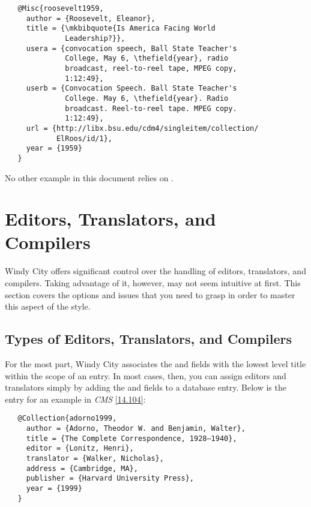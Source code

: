 \documentclass[11pt,letterpaper,oneside]{article}
\begin{document}
\begin{verbatim}
   @Misc{roosevelt1959,
     author = {Roosevelt, Eleanor},
     title = {\mkbibquote{Is America Facing World
              Leadership?}},
     usera = {convocation speech, Ball State Teacher's
              College, May 6, \thefield{year}, radio
              broadcast, reel-to-reel tape, MPEG copy,
              1:12:49},
     userb = {Convocation Speech. Ball State Teacher's
              College. May 6, \thefield{year}. Radio
              broadcast. Reel-to-reel tape. MPEG copy.
              1:12:49},
     url = {http://libx.bsu.edu/cdm4/singleitem/collection/
            ElRoos/id/1},
     year = {1959}
   }
\end{verbatim}

\noindent No other example in this document relies on .

\section{Editors, Translators, and Compilers}
\label{edtrans}

Windy City offers significant control over the handling of editors,
translators, and compilers. Taking advantage of it, however, may not
seem intuitive at first. This section covers the options and issues
that you need to grasp in order to master this aspect of the style.

\subsection{Types of Editors, Translators, and Compilers}
\label{edtransnames}

For the most part, Windy City associates the  and
 fields with the lowest level title within the
scope of an entry. In most cases, then, you can assign editors and
translators simply by adding the  and
 fields to a database entry. Below is the entry
for an example in \textit{CMS} \ref{14.104}:

\begin{verbatim}
   @Collection{adorno1999,
     author = {Adorno, Theodor W. and Benjamin, Walter},
     title = {The Complete Correspondence, 1928–1940},
     editor = {Lonitz, Henri},
     translator = {Walker, Nicholas},
     address = {Cambridge, MA},
     publisher = {Harvard University Press},
     year = {1999}
   }
\end{verbatim}
\end{document}
